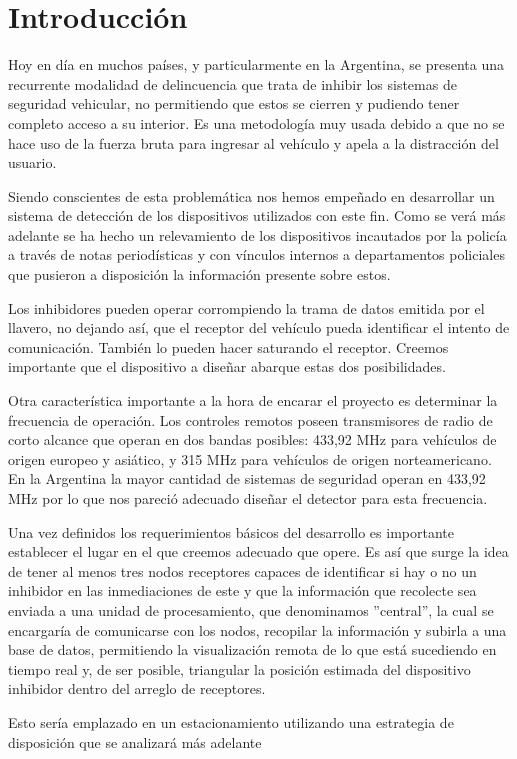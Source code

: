 \chapter{Introducción}
Hoy en día en muchos países, y particularmente en la Argentina, se presenta una recurrente modalidad de delincuencia que trata de 
inhibir los sistemas de seguridad vehicular, no permitiendo que estos se cierren y pudiendo tener completo acceso a su interior. Es 
una metodología muy usada debido a que no se hace uso de la fuerza bruta para ingresar al vehículo y apela a la distracción del usuario.\par
Siendo conscientes de esta problemática nos hemos empeñado en desarrollar un sistema de detección de los dispositivos utilizados
con este fin. Como se verá más adelante se ha hecho un relevamiento de los dispositivos incautados por la policía a través de notas
periodísticas y con vínculos internos a departamentos policiales que pusieron a disposición la información presente sobre estos.\par
Los inhibidores pueden operar corrompiendo la trama de datos emitida por el llavero, no dejando así, que el receptor del vehículo 
pueda identificar el intento de comunicación. También lo pueden hacer saturando el receptor. Creemos importante que el dispositivo a diseñar 
abarque estas dos posibilidades. \par
Otra característica importante a la hora de encarar el proyecto es determinar la frecuencia de operación. Los controles remotos poseen transmisores
de radio de corto alcance que operan en dos bandas posibles: 433,92 MHz para vehículos de origen europeo y asiático, y 315 MHz para vehículos de origen 
norteamericano. En la Argentina la mayor cantidad de sistemas de seguridad operan en 433,92 MHz por lo que nos pareció adecuado diseñar el
detector para esta frecuencia. \par
Una vez definidos los requerimientos básicos del desarrollo es importante establecer el lugar en el que creemos adecuado que opere. Es así
que surge la idea de tener al menos tres nodos receptores capaces de identificar si hay o no un inhibidor en las inmediaciones de este
y que la información que recolecte sea enviada a una unidad de procesamiento, que denominamos ''central'', la cual se encargaría de 
comunicarse con los nodos, recopilar la información y subirla a una base de datos, permitiendo la visualización remota de lo que está sucediendo 
en tiempo real y, de ser posible, triangular la posición estimada del dispositivo inhibidor dentro del arreglo de receptores.\par
Esto sería emplazado en un estacionamiento utilizando una estrategia de disposición que se analizará más adelante


